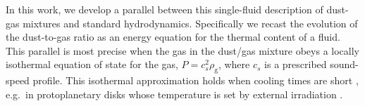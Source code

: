\documentclass[iop, numberedappendix]{emulateapj}
\newcommand{\rhod}{\rho_\mathrm{d}}
\newcommand{\rhog}{\rho_\mathrm{g}}
\newcommand{\tstop}{t_\mathrm{s}}
\begin{document}
%



In this work, we develop a parallel between this single-fluid description of dust-gas mixtures and standard hydrodynamics.
Specifically we recast the evolution of the dust-to-gas ratio as an energy equation for the thermal content of a fluid.
This parallel is most precise when the gas in the dust/gas mixture obeys a locally isothermal equation of state for the gas, $P = c_s^2\rhog$, where $c_s$ is a prescribed sound-speed profile.   This isothermal approximation holds when cooling times are short \citep{lin15}, e.g.\ in protoplanetary disks 
 whose temperature is set by external irradiation
\citep{chiang97,stam08}. 



 
\end{document}
